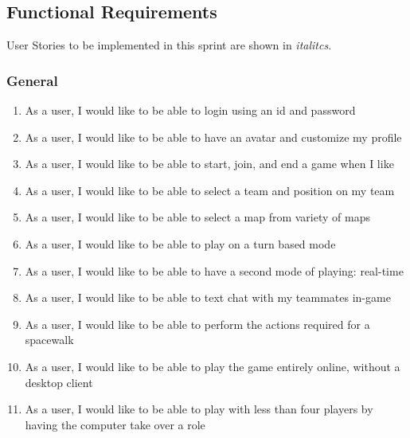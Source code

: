 \subsection*{Functional Requirements}

\hspace*{6mm} User Stories to be implemented in this sprint are shown in \textit{italitcs}. 

\subsubsection*{General}
\begin{enumerate}[leftmargin=\listmargin]
\item As a user, I would like to be able to login using an id and password
\item As a user, I would like to be able to have an avatar and customize my profile
\item As a user, I would like to be able to start, join, and end a game when I like
\item As a user, I would like to be able to select a team and position on my team
\item As a user, I would like to be able to select a map from variety of maps
\item As a user, I would like to be able to play on a turn based mode
\item As a user, I would like to be able to have a second mode of playing: real-time
\item As a user, I would like to be able to text chat with my teammates in-game
\item As a user, I would like to be able to perform the actions required for a spacewalk
\item As a user, I would like to be able to play the game entirely online, without a desktop client
\item As a user, I would like to be able to play with less than four players by having the computer take over a role
\end{enumerate}
